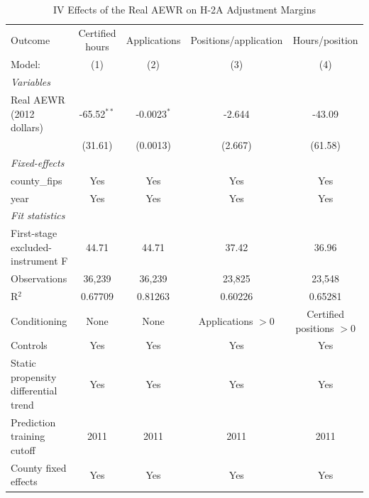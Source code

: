 
\begin{table}[htbp]
   \caption{\label{tab:iv_h2a_adjustment_margins} IV Effects of the Real AEWR on H-2A Adjustment Margins}
   \centering
   \begin{tabular}{lcccc}
      \tabularnewline \midrule \midrule
      Outcome                              & Certified hours & Applications  & Positions/application & Hours/position \\
      Model:                               & (1)             & (2)           & (3)                   & (4)\\
      \midrule
      \emph{Variables}\\
      Real AEWR (2012 dollars)             & -65.52$^{**}$   & -0.0023$^{*}$ & -2.644                & -43.09\\
                                           & (31.61)         & (0.0013)      & (2.667)               & (61.58)\\
      \midrule
      \emph{Fixed-effects}\\
      county\_fips                         & Yes             & Yes           & Yes                   & Yes\\
      year                                 & Yes             & Yes           & Yes                   & Yes\\
      \midrule
      \emph{Fit statistics}\\
      First-stage excluded-instrument F    & 44.71           & 44.71         & 37.42                 & 36.96\\
      Observations                         & 36,239          & 36,239        & 23,825                & 23,548\\
      R$^2$                                & 0.67709         & 0.81263       & 0.60226               & 0.65281\\
      Conditioning                         & None            & None          & Applications $>0$     & Certified positions $>0$\\
      Controls                             & Yes             & Yes           & Yes                   & Yes\\
      Static propensity differential trend & Yes             & Yes           & Yes                   & Yes\\
      Prediction training cutoff           & 2011            & 2011          & 2011                  & 2011\\
      County fixed effects                 & Yes             & Yes           & Yes                   & Yes\\

\end{tabular}
\end{table}
